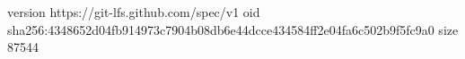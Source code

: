 version https://git-lfs.github.com/spec/v1
oid sha256:4348652d04fb914973c7904b08db6e44dcce434584ff2e04fa6c502b9f5fc9a0
size 87544
